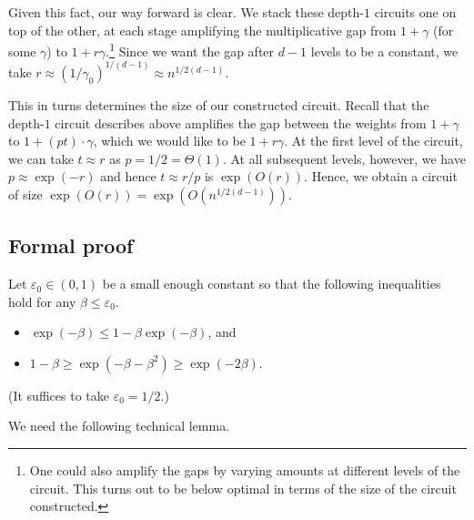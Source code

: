 \documentclass[11pt]{article}
\numberwithin{equation}{section}
\theoremstyle{definition}
\theoremstyle{plain}
\begin{document}
Given this fact, our way forward is clear. We stack these depth-$1$ circuits one on top of the other, at each stage amplifying the multiplicative gap from $1+\gamma$ (for some $\gamma$) to $1+r\gamma$.\footnote{One could also amplify the gaps by varying amounts at different levels of the circuit. This turns out to be %
%
%
below optimal 
in terms of the size of the circuit constructed.} Since we want the gap after $d-1$ levels to be a constant, we take $r \approx (1/\gamma_0)^{1/(d-1)} \approx n^{1/2(d-1)}$.

This in turns determines the size of our constructed circuit. Recall that the depth-$1$ circuit describes above amplifies the gap between the weights from $1+\gamma$ to $1+(pt)\cdot \gamma$, which we would like to be $1+r\gamma$. At the first level of the circuit, we can take $t\approx r$ as $p = 1/2 = \Theta(1)$. At all subsequent levels, however, we have $p\approx \exp(-r)$ and hence $t \approx r/p$ is $\exp(O(r))$. Hence, we obtain a circuit of size $\exp(O(r)) = \exp(O(n^{1/2(d-1)}))$.


\subsection{Formal proof}

Let $\varepsilon_0\in (0,1)$ be a small enough constant so that the following inequalities hold for any $\beta \leq \varepsilon_0$.
\begin{itemize}
\item $\exp(-\beta) \leq 1-\beta\exp(-\beta)$, and
\item $1-\beta \geq \exp(-\beta-\beta^2)\geq \exp(-2\beta)$.
\end{itemize}
(It suffices to take $\varepsilon_0 = 1/2$.) 

We need the following technical lemma.
\end{document}
